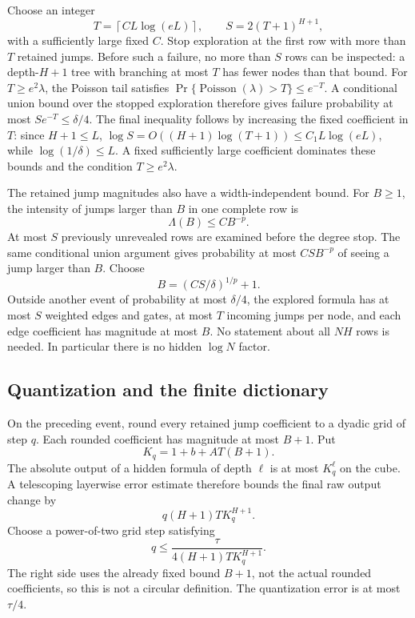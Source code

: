 Choose an integer
\[
 T=\left\lceil C L\log(eL)\right\rceil,
 \qquad S=2(T+1)^{H+1},
\]
with a sufficiently large fixed $C$. Stop exploration at the first row with more than $T$ retained jumps. Before such a failure, no more than $S$ rows can be inspected: a depth-$H+1$ tree with branching at most $T$ has fewer nodes than that bound. For $T\ge e^2\lambda$, the Poisson tail satisfies
$\Pr\{\operatorname{Poisson}(\lambda)>T\}\le e^{-T}$.
A conditional union bound over the stopped exploration therefore gives failure probability at most $S e^{-T}\le\delta/4$. The final inequality follows by increasing the fixed coefficient in $T$: since $H+1\le L$, $\log S=O((H+1)\log(T+1))\le C_1L\log(eL)$, while $\log(1/\delta)\le L$. A fixed sufficiently large coefficient dominates these bounds and the condition $T\ge e^2\lambda$.

The retained jump magnitudes also have a width-independent bound. For $B\ge1$, the intensity of jumps larger than $B$ in one complete row is
\[
 \Lambda(B)\le C B^{-p}.
\]
At most $S$ previously unrevealed rows are examined before the degree stop. The same conditional union argument gives probability at most $CSB^{-p}$ of seeing a jump larger than $B$. Choose
\[
 B=(C S/\delta)^{1/p}+1.
\]
Outside another event of probability at most $\delta/4$, the explored formula has at most $S$ weighted edges and gates, at most $T$ incoming jumps per node, and each edge coefficient has magnitude at most $B$. No statement about all $N H$ rows is needed. In particular there is no hidden $\log N$ factor.

\subsection{Quantization and the finite dictionary}
On the preceding event, round every retained jump coefficient to a dyadic grid of step $q$. Each rounded coefficient has magnitude at most $B+1$. Put
\[
 K_q=1+b+AT(B+1).
\]
The absolute output of a hidden formula of depth $\ell$ is at most $K_q^{\ell}$ on the cube. A telescoping layerwise error estimate therefore bounds the final raw output change by
\[
 q(H+1)T K_q^{H+1}.
\]
Choose a power-of-two grid step satisfying
\[
 q\le\frac{\tau}{4(H+1)T K_q^{H+1}}.
\]
The right side uses the already fixed bound $B+1$, not the actual rounded coefficients, so this is not a circular definition. The quantization error is at most $\tau/4$.

